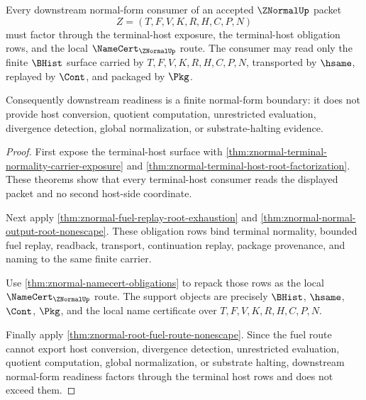 \begin{theorem}
\label{thm:znormal-root-downstream-normal-form-readiness}
Every downstream normal-form consumer of an accepted $\ZNormalUp$ packet
$$
Z=(T,F,V,K,R,H,C,P,N)
$$
must factor through the terminal-host exposure, the terminal-host obligation
rows, and the local $\NameCert_{\ZNormalUp}$ route. The consumer may read only
the finite $\BHist$ surface carried by $T,F,V,K,R,H,C,P,N$, transported by
$\hsame$, replayed by $\Cont$, and packaged by $\Pkg$.

Consequently downstream readiness is a finite normal-form boundary: it does
not provide host conversion, quotient computation, unrestricted evaluation,
divergence detection, global normalization, or substrate-halting evidence.
\end{theorem}
\begin{proof}
First expose the terminal-host surface with
\autoref{thm:znormal-terminal-normality-carrier-exposure} and
\autoref{thm:znormal-terminal-host-root-factorization}. These theorems show
that every terminal-host consumer reads the displayed packet and no second
host-side coordinate.

Next apply \autoref{thm:znormal-fuel-replay-root-exhaustion} and
\autoref{thm:znormal-normal-output-root-nonescape}. These obligation rows bind
terminal normality, bounded fuel replay, readback, transport, continuation
replay, package provenance, and naming to the same finite carrier.

Use \autoref{thm:znormal-namecert-obligations} to repack those rows as the
local $\NameCert_{\ZNormalUp}$ route. The support objects are precisely
$\BHist$, $\hsame$, $\Cont$, $\Pkg$, and the local name certificate over
$T,F,V,K,R,H,C,P,N$.

Finally apply \autoref{thm:znormal-root-fuel-route-nonescape}. Since the fuel
route cannot export host conversion, divergence detection, unrestricted
evaluation, quotient computation, global normalization, or substrate halting,
downstream normal-form readiness factors through the terminal host rows and
does not exceed them.
\end{proof}
